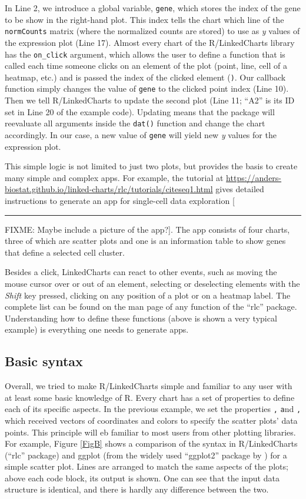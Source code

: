 \documentclass[twocolumn,10pt]{article}
\newcommand{\blockade}{\rule{3em}{0.7em}}  %
\newcommand{\fixme}[1]{[ \blockade FIXME: #1]}
\begin{document}
In Line 2, we introduce a global variable, \texttt{gene}, which stores the index of the gene to be show in the right-hand plot. This index tells the chart which line of the \texttt{normCounts} matrix (where the normalized counts are stored) to use as \emph{y} values of the expression plot (Line 17). Almost every chart of the R/LinkedCharts library has the \texttt{on_click} argument, which allows the user to define a function that is called each time someone clicks on an element of the plot (point, line, cell of a heatmap, etc.) and is passed the index of the clicked element (\texttt).  Our callback function simply changes the value of \texttt{gene} to the clicked point index (Line 10). Then we tell R/LinkedCharts to update the second plot (Line 11; ``A2'' is its ID set in Line 20 of the example code). Updating means that the package will reevaluate all arguments inside the \texttt{dat()} function and change the chart accordingly. In our case, a new value of \texttt{gene} will yield new \emph{y} values for the expression plot.

This simple logic is not limited to just two plots, but provides the basis to create many simple and complex apps. For example, the tutorial at \url{https://anders-biostat.github.io/linked-charts/rlc/tutorials/citeseq1.html} gives detailed instructions to generate an app for single-cell data exploration \fixme{Maybe include a picture of the app?}. The app consists of four charts, three of which are scatter plots and one is an information table to show genes that define a selected cell cluster.

Besides a click, LinkedCharts can react to other events, such as moving the mouse cursor over or out of an element, selecting or deselecting elements with the \emph{Shift} key pressed, clicking on any position of a plot or on a heatmap label. The complete list can be found on the man page of any function of the ``rlc'' package. Understanding how to define these functions (above is shown a very typical example) is everything one needs to generate apps. 

\subsection{Basic syntax}

Overall, we tried to make R/LinkedCharts simple and familiar to any user with at least some basic knowledge of R. Every chart has a set of properties to define each of its specific aspects. In the previous example, we set the properties \texttt, \texttt and \texttt, which received vectors of coordinates and colors to specify the scatter plots' data points. This principle will eb familiar to most users from other plotting libraries. For example, Figure \ref{FigB} shows a comparison of the syntax in R/LinkedCharts (``rlc'' package) and ggplot (from the widely used ``ggplot2'' package by \citet{wickham_2016}) for a simple scatter plot. Lines are arranged to match the same aspects of the plots; above each code block, its output is shown. One can see that the input data structure is identical, and there is hardly any difference between the two.
\end{document}
